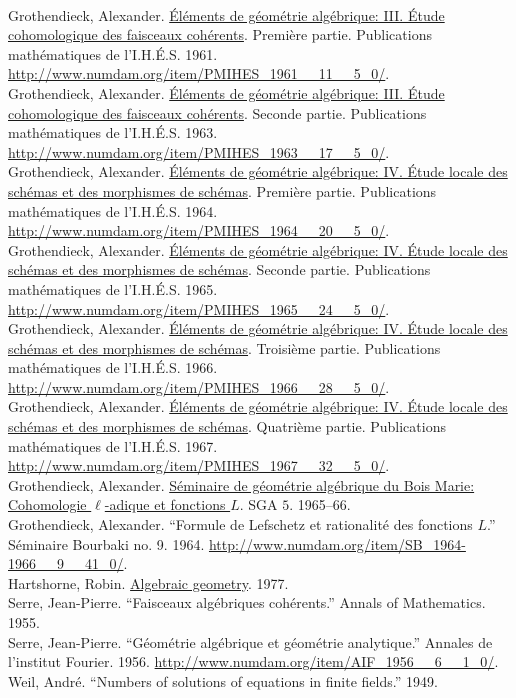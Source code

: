 \documentclass [11 pt, oneside] {article}
\begin{document}
{    	\\[1 em]
    Grothendieck, Alexander. \ul{\'El\'ements de g\'eom\'etrie alg\'ebrique: III. \'Etude cohomologique des faisceaux coh\'erents}. Premi\`ere partie. Publications math\'ematiques de l'I.H.\'E.S. 1961. \url{http://www.numdam.org/item/PMIHES_1961__11__5_0/}.
    	\\[1 em]
    Grothendieck, Alexander. \ul{\'El\'ements de g\'eom\'etrie alg\'ebrique: III. \'Etude cohomologique des faisceaux coh\'erents}. Seconde partie. Publications math\'ematiques de l'I.H.\'E.S. 1963. \url{http://www.numdam.org/item/PMIHES_1963__17__5_0/}.
    	\\[1 em]
    Grothendieck, Alexander. \ul{\'El\'ements de g\'eom\'etrie alg\'ebrique: IV. \'Etude locale des sch\'emas et des morphismes de sch\'emas}. Premi\`ere partie. Publications math\'ematiques de l'I.H.\'E.S. 1964. \url{http://www.numdam.org/item/PMIHES_1964__20__5_0/}.
    	\\[1 em]
    Grothendieck, Alexander. \ul{\'El\'ements de g\'eom\'etrie alg\'ebrique: IV. \'Etude locale des sch\'emas et des morphismes de sch\'emas}. Seconde partie. Publications math\'ematiques de l'I.H.\'E.S. 1965. \url{http://www.numdam.org/item/PMIHES_1965__24__5_0/}.
    	\\[1 em]
    Grothendieck, Alexander. \ul{\'El\'ements de g\'eom\'etrie alg\'ebrique: IV. \'Etude locale des sch\'emas et des morphismes de sch\'emas}. Troisi\`eme partie. Publications math\'ematiques de l'I.H.\'E.S. 1966. \url{http://www.numdam.org/item/PMIHES_1966__28__5_0/}.
    	\\[1 em]
    Grothendieck, Alexander. \ul{\'El\'ements de g\'eom\'etrie alg\'ebrique: IV. \'Etude locale des sch\'emas et des morphismes de sch\'emas}. Quatri\`eme partie. Publications math\'ematiques de l'I.H.\'E.S. 1967. \url{http://www.numdam.org/item/PMIHES_1967__32__5_0/}.
    	\\[1 em]
    Grothendieck, Alexander. \ul{S\'eminaire de g\'eom\'etrie alg\'ebrique du Bois Marie: Cohomologie $\ell$-adique et fonctions $L$}. SGA $5$. 1965--66.
    	\\[1 em]
    Grothendieck, Alexander. ``Formule de Lefschetz et rationalit\'e des fonctions $L$.'' S\'eminaire Bourbaki no. 9. 1964. \url{http://www.numdam.org/item/SB_1964-1966__9__41_0/}.
    	\\[1 em]
    Hartshorne, Robin. \ul{Algebraic geometry}. 1977.
    	\\[1 em]
    Serre, Jean-Pierre. ``Faisceaux alg\'ebriques coh\'erents.'' Annals of Mathematics. 1955.
    	\\[1 em]
    Serre, Jean-Pierre. ``G\'eom\'etrie alg\'ebrique et g\'eom\'etrie analytique.'' Annales de l'institut Fourier. 1956. \url{http://www.numdam.org/item/AIF_1956__6__1_0/}.
   	\\[1 em]
    Weil, Andr\'e. ``Numbers of solutions of equations in finite fields.'' 1949.
}
\end{document}

